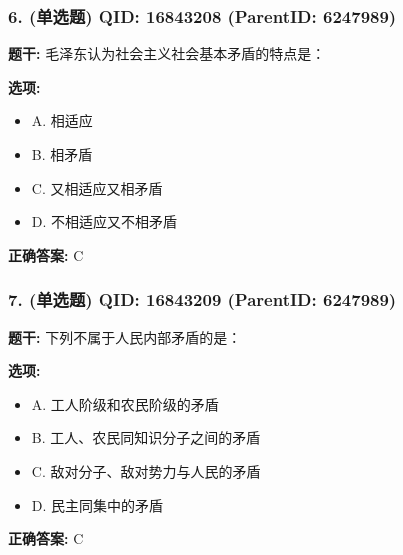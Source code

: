 \documentclass[12pt,UTF8]{ctexart}
\begin{document}
\vspace{0.3em}\hrulefill\vspace{0.7em}

\subsubsection*{6. (单选题) \small QID: 16843208 (ParentID: 6247989)}

\textbf{题干:}
毛泽东认为社会主义社会基本矛盾的特点是：



\textbf{选项:}
\begin{itemize}[leftmargin=*]

  \item A. 相适应

  \item B. 相矛盾

  \item C. 又相适应又相矛盾

  \item D. 不相适应又不相矛盾

\end{itemize}

\textbf{正确答案:}
C

\vspace{0.3em}\hrulefill\vspace{0.7em}

\subsubsection*{7. (单选题) \small QID: 16843209 (ParentID: 6247989)}

\textbf{题干:}
下列不属于人民内部矛盾的是：



\textbf{选项:}
\begin{itemize}[leftmargin=*]

  \item A. 工人阶级和农民阶级的矛盾

  \item B. 工人、农民同知识分子之间的矛盾

  \item C. 敌对分子、敌对势力与人民的矛盾

  \item D. 民主同集中的矛盾

\end{itemize}

\textbf{正确答案:}
C

\vspace{0.3em}\hrulefill\vspace{0.7em}
\end{document}

